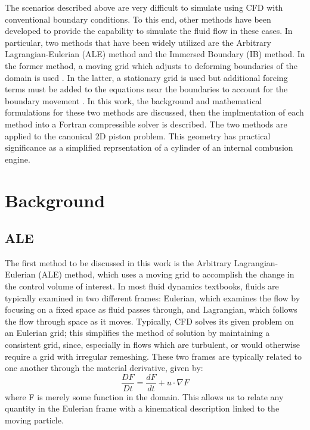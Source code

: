 \documentclass{article}
\def\deriv#1#2{\frac{d #1}{d #2}}
\begin{document}
The scenarios described above are very difficult to simulate using CFD with conventional boundary conditions.  To this end, other methods have been developed to provide the capability to simulate the fluid flow in these cases. In particular, two methods that have been widely utilized are the Arbitrary Lagrangian-Eulerian (ALE) method and the Immersed Boundary (IB) method. In the former method, a moving grid which adjusts to deforming boundaries of the domain is used \cite{hirt74}. In the latter, a stationary grid is used but additional forcing terms must be added to the equations near the boundaries to account for the boundary movement \cite{peskin1972,mittal2005}. In this work, the background and mathematical formulations for these two methods are discussed, then the implmentation of each method into a Fortran compressible solver is described. The two methods are applied to the canonical 2D piston problem. This geometry has practical significance as a simplified reprsentation of a cylinder of an internal combusion engine. 

 

\section{Background}

\subsection{ALE}

The first method to be discussed in this work is the Arbitrary Lagrangian-Eulerian (ALE) method, which uses a moving grid to accomplish the change in the control volume of interest.  In most fluid dynamics textbooks, fluids are typically examined in two different frames: Eulerian, which examines the flow by focusing on a fixed space as fluid passes through, and Lagrangian, which follows the flow through space as it moves.  Typically, CFD solves its given problem on an Eulerian grid; this simplifies the method of solution by maintaining a consistent grid, since, especially in flows which are turbulent, or would otherwise require a grid with irregular remeshing.  These two frames are typically related to one another through the material derivative, given by:
\begin{equation}
  \frac{DF}{Dt} = \deriv{F}{t} + u \cdot \nabla F
\end{equation}
where F is merely some function in the domain.  This allows us to relate any quantity in the Eulerian frame with a kinematical description linked to the moving particle.  
\end{document}
